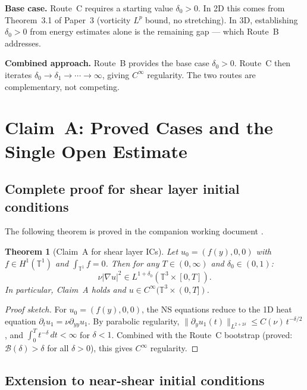 \documentclass[11pt]{article}
\newtheorem{theorem}{Theorem}[section]
\theoremstyle{definition}
\theoremstyle{remark}
\newcommand{\T}{\mathbb{T}}
\newcommand{\grad}{\nabla}
\newcommand{\dlt}{\delta}
\begin{document}
\textbf{Base case.}
Route~C requires a starting value $\dlt_0>0$.  In 2D this comes from
Theorem~3.1 of Paper~3 (vorticity $L^p$ bound, no stretching).  In 3D,
establishing $\dlt_0>0$ from energy estimates alone is the remaining gap —
which Route~B addresses.

\textbf{Combined approach.}
Route~B provides the base case $\dlt_0>0$.  Route~C then iterates
$\dlt_0\to\dlt_1\to\cdots\to\infty$, giving $C^\infty$ regularity.
The two routes are complementary, not competing.

\section{Claim~A: Proved Cases and the Single Open Estimate}
\label{sec:proved-cases}

\subsection{Complete proof for shear layer initial conditions}
\label{sec:shear-proof}

The following theorem is proved in the companion working document
\cite{WorkingProof2026}.

\begin{theorem}[Claim~A for shear layer ICs]
\label{thm:shear}
  Let $u_0=(f(y),0,0)$ with $f\in H^1(\T^1)$ and $\int_{\T^1}f=0$.
  Then for any $T\in(0,\infty)$ and $\dlt_0\in(0,1)$:
  \[
    \nu|\grad u|^2\in L^{1+\dlt_0}(\T^3\times[0,T]).
  \]
  In particular, Claim~A holds and $u\in C^\infty(\T^3\times(0,T])$.
\end{theorem}

\begin{proof}[Proof sketch]
  For $u_0=(f(y),0,0)$, the NS equations reduce to the 1D heat equation
  $\partial_t u_1=\nu\partial_{yy}u_1$.  By parabolic regularity,
  $\|\partial_y u_1(t)\|_{L^{2+2\dlt}}\leq C(\nu)\,t^{-\dlt/2}$,
  and $\int_0^T t^{-\dlt}\,dt<\infty$ for $\dlt<1$.
  Combined with the Route~C bootstrap (proved: $\mathcal{B}(\dlt)>\dlt$
  for all $\dlt>0$), this gives $C^\infty$ regularity.
\end{proof}

\subsection{Extension to near-shear initial conditions}
\label{sec:near-shear}
\end{document}
